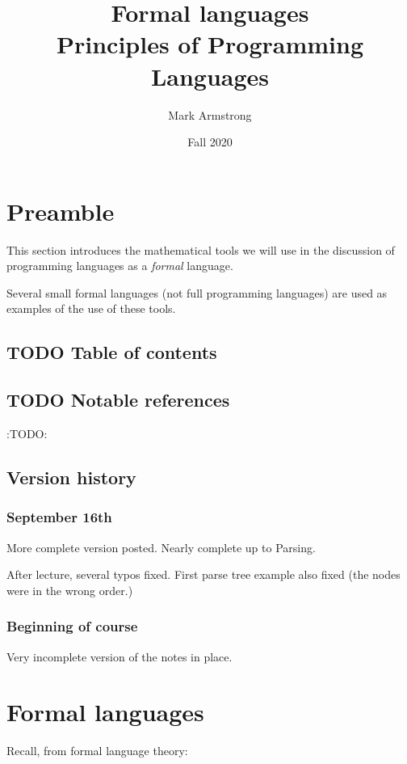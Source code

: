 \documentclass[11pt]{article}
\author{Mark Armstrong}
\date{Fall 2020}
\title{Formal languages\\\medskip
\large Principles of Programming Languages}
\theoremstyle{definition}
\begin{document}
\maketitle

\section{Preamble}
\label{sec:org00cf8f6}
This section introduces the mathematical tools
we will use in the discussion of programming languages
as a \emph{formal} language.

Several small formal languages (not full programming languages)
are used as examples of the use of these tools.

\subsection{{\bfseries\sffamily TODO} Table of contents}
\label{sec:org4106c47}
\begin{scriptsize}

\end{scriptsize}

\subsection{{\bfseries\sffamily TODO} Notable references}
\label{sec:orgeeb35c0}
:TODO:

\subsection{Version history}
\label{sec:org7b988a6}
\subsubsection{September 16th}
\label{sec:orgaa1ea40}
More complete version posted. Nearly complete up to Parsing.

After lecture, several typos fixed.
First parse tree example also fixed
(the nodes were in the wrong order.)

\subsubsection{Beginning of course}
\label{sec:org59de423}
Very incomplete version of the notes in place.

\section{Formal languages}
\label{sec:org32f0595}
Recall, from formal language theory:
\end{document}
